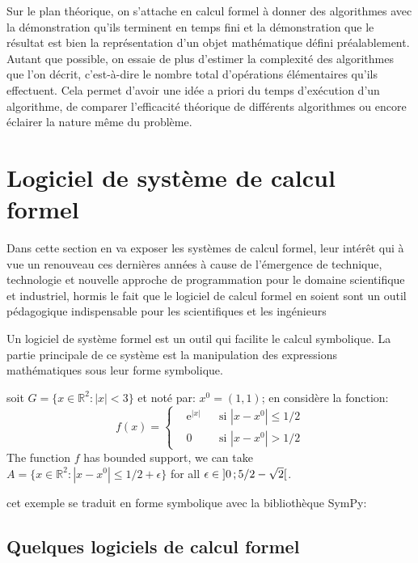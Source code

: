 \documentclass[11pt,fleqn]{book} %
\begin{document}
Sur le plan théorique, on s'attache en calcul formel à donner des algorithmes avec la démonstration qu'ils terminent en temps fini et la démonstration que le résultat est bien la représentation d'un objet mathématique défini préalablement. Autant que possible, on essaie de plus d'estimer la complexité des algorithmes que l'on décrit, c'est-à-dire le nombre total d'opérations élémentaires qu'ils effectuent. Cela permet d'avoir une idée a priori du temps d'exécution d'un algorithme, de comparer l'efficacité théorique de différents algorithmes ou encore éclairer la nature même du problème.
\section{Logiciel de système de calcul formel}
Dans cette section en va exposer les systèmes de calcul formel, leur intérêt qui à vue un renouveau ces dernières années à cause de l'émergence de technique, technologie et nouvelle approche de programmation pour le domaine scientifique et industriel, hormis le fait que le logiciel de calcul formel en soient sont un outil pédagogique 
indispensable pour les scientifiques et les ingénieurs

\begin{definition}
Un logiciel de système formel est un outil qui facilite le calcul symbolique. La partie principale de ce système est la manipulation des expressions mathématiques sous leur forme symbolique.
\end{definition}

\begin{example}
soit $G=\{x\in\mathbb{R}^2:|x|<3\}$ et noté par: $x^0=(1,1)$; en considère la fonction:
\begin{equation}
f(x)=\left\{\begin{aligned} & \mathrm{e}^{|x|} & & \text{si $|x-x^0|\leq 1/2$}\\
& 0 & & \text{si $|x-x^0|> 1/2$}\end{aligned}\right.
\end{equation}
The function $f$ has bounded support, we can take $A=\{x\in\mathbb{R}^2:|x-x^0|\leq 1/2+\epsilon\}$ for all $\epsilon\in\mathopen{]}0\,;5/2-\sqrt{2}\mathclose{[}$.
\end{example}

cet exemple se traduit en forme symbolique avec la bibliothèque SymPy:

\subsection{Quelques logiciels de calcul formel}
\end{document}
